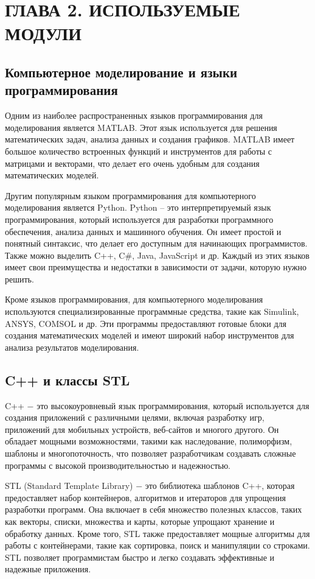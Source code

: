\chapter{ГЛАВА 2. ИСПОЛЬЗУЕМЫЕ МОДУЛИ}
\label{ch:chapter2}
\section{Компьютерное моделирование и языки программирования}

Одним из наиболее распространенных языков программирования для моделирования является MATLAB. Этот язык используется для решения математических задач, анализа данных и создания графиков. MATLAB имеет большое количество встроенных функций и инструментов для работы с матрицами и векторами, что делает его очень удобным для создания математических моделей.

Другим популярным языком программирования для компьютерного моделирования является Python. Python – это интерпретируемый язык программирования, который используется для разработки программного обеспечения, анализа данных и машинного обучения. Он имеет простой и понятный синтаксис, что делает его доступным для начинающих программистов. Также можно выделить C++, C\#, Java, JavaScript и др. Каждый из этих языков имеет свои преимущества и недостатки в зависимости от задачи, которую нужно решить.

Кроме языков программирования, для компьютерного моделирования используются специализированные программные средства, такие как Simulink, ANSYS, COMSOL и др. Эти программы предоставляют готовые блоки для создания математических моделей и имеют широкий набор инструментов для анализа результатов моделирования.

\section{C++ и классы STL}

C++ $-$ это высокоуровневый язык программирования, который используется для создания приложений с различными целями, включая разработку игр, приложений для мобильных устройств, веб-сайтов и многого другого. Он обладает мощными возможностями, такими как наследование, полиморфизм, шаблоны и многопоточность, что позволяет разработчикам создавать сложные программы с высокой производительностью и надежностью.

STL (Standard Template Library) $-$ это библиотека шаблонов C++, которая предоставляет набор контейнеров, алгоритмов и итераторов для упрощения разработки программ. Она включает в себя множество полезных классов, таких как векторы, списки, множества и карты, которые упрощают хранение и обработку данных. Кроме того, STL также предоставляет мощные алгоритмы для работы с контейнерами, такие как сортировка, поиск и манипуляции со строками. STL позволяет программистам быстро и легко создавать эффективные и надежные приложения.

